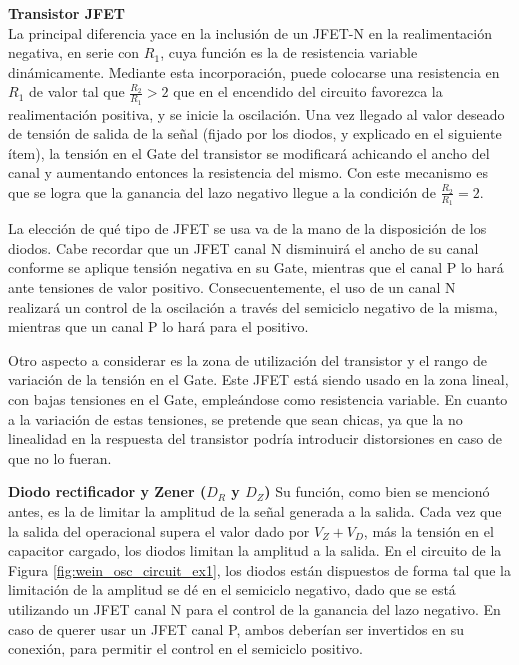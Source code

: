 \textbf{Transistor JFET}\\
La principal diferencia yace en la inclusión de un JFET-N en la realimentación negativa, en serie con $R_1$, cuya función es la de resistencia variable 
dinámicamente.
Mediante esta incorporación, puede colocarse una resistencia en $R_1$ de valor tal que $\frac{R_2}{R_1} > 2$ que en el encendido del circuito favorezca 
la realimentación positiva, y se inicie la oscilación.
Una vez llegado al valor deseado de tensión de salida de la señal (fijado por los diodos, y explicado en el siguiente ítem), la tensión en el Gate del 
transistor se modificará achicando el ancho del canal y aumentando entonces la resistencia del mismo.
Con este mecanismo es que se logra que la ganancia del lazo negativo llegue a la condición de $\frac{R_2}{R_1} = 2$.

La elección de qué tipo de JFET se usa va de la mano de la disposición de los diodos.
Cabe recordar que un JFET canal N disminuirá el ancho de su canal conforme se aplique tensión negativa en su Gate, mientras que el canal P lo hará ante 
tensiones de valor positivo.
Consecuentemente, el uso de un canal N realizará un control de la oscilación a través del semiciclo negativo de la misma, mientras que un canal P lo hará 
para el positivo.

Otro aspecto a considerar es la zona de utilización del transistor y el rango de variación de la tensión en el Gate.
Este JFET está siendo usado en la zona lineal, con bajas tensiones en el Gate, empleándose como resistencia variable.
En cuanto a la variación de estas tensiones, se pretende que sean chicas, ya que la no linealidad en la respuesta del transistor podría introducir 
distorsiones en caso de que no lo fueran.
\newline

\textbf{Diodo rectificador y Zener ($D_R$ y $D_Z$)}
Su función, como bien se mencionó antes, es la de limitar la amplitud de la señal generada a la salida.
Cada vez que la salida del operacional supera el valor dado por $V_Z + V_D$, más la tensión en el capacitor cargado, los diodos limitan la amplitud a la 
salida.
En el circuito de la Figura \ref{fig:wein_osc_circuit_ex1}, los diodos están dispuestos de forma tal que la limitación de la amplitud se dé en el 
semiciclo negativo, dado que se está utilizando un JFET canal N para el control de la ganancia del lazo negativo.
En caso de querer usar un JFET canal P, ambos deberían ser invertidos en su conexión, para permitir el control en el semiciclo positivo.

